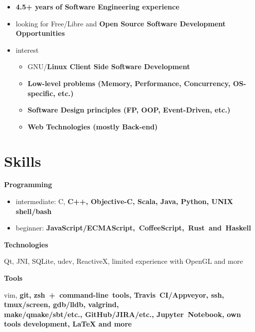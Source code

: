 \begin{itemize}[rightmargin=\dimexpr\linewidth-18cm-\leftmargin\relax]
    \item \bfseries 4.5+ years \mdseries of Software Engineering experience
    \item looking for Free/Libre and \bfseries Open Source \mdseries Software Development Opportunities
    \item interest
    \begin{itemize}
        \item GNU/\bfseries Linux \mdseries Client Side Software Development
        \item \bfseries Low-level \mdseries problems (Memory, Performance, Concurrency, OS-specific, etc.)
        \item \bfseries Software Design \mdseries principles (FP, OOP, Event-Driven, etc.)
        \item \bfseries Web \mdseries Technologies (mostly Back-end)
    \end{itemize}
\end{itemize}

\section*{Skills}

    \bfseries Programming\mdseries
    \begin{itemize}[rightmargin=\dimexpr\linewidth-17.5cm-\leftmargin\relax]
        \item intermediate:
            C,
            \bfseries C++\mdseries,
            Objective-C,
            \bfseries Scala\mdseries,
            Java,
            \bfseries Python\mdseries,
            UNIX shell/\bfseries bash\mdseries
        \item beginner: \bfseries JavaScript/\mdseries ECMAScript,~CoffeeScript,~\bfseries Rust\mdseries~and~Haskell
    \end{itemize}

    \vspace{0.4cm}
    \bfseries Technologies\mdseries

        Qt,
        JNI,
        SQLite,
        udev,
        ReactiveX,
        limited experience with OpenGL and more

    \vspace{0.4cm}
    \bfseries Tools \mdseries
    \begin{adjustwidth}{15pt}{20pt}
        vim,
        \bfseries git\mdseries,
        zsh~+~command-line~tools,
        \bfseries Travis~CI\mdseries/Appveyor,
        ssh,
        tmux/screen,
        \bfseries gdb\mdseries/lldb,
        valgrind,\\
        make/qmake/sbt/etc.,
        \bfseries GitHub\mdseries/JIRA/etc.,
        \bfseries Jupyter~\mdseries Notebook,
        own \bfseries tools development\mdseries,
        {\LaTeX }
        and more
    \end{adjustwidth}

